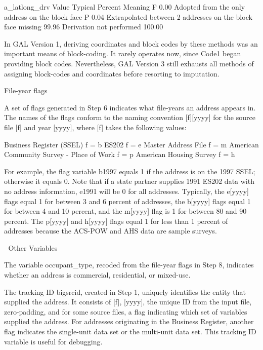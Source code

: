a_latlong_drv
Value  Typical Percent   Meaning
F               0.00          Adopted from the only address on the block face
P               0.04          Extrapolated between 2 addresses on the block face
missing                99.96       Derivation not performed
              100.00

In GAL Version 1, deriving coordinates and block codes by these methods was an important means of
block-coding. It rarely operates now, since Code1 began providing block codes. Nevertheless, GAL
Version 3 still exhausts all methods of assigning block-codes and coordinates before resorting to
imputation. 

File-year flags

A set of flags generated in Step 6 indicates what file-years an address appears in. The names of the flags
conform to the naming convention [f][yyyy] for the source file [f] and year [yyyy], where [f] takes the
following values:

Business Register (SSEL)                f = b
ES202                              f = e
Master Address File                     f = m
American Community Survey - Place of Work    f = p
American Housing Survey            f = h

For example, the flag variable b1997 equals 1 if the address is on the 1997 SSEL; otherwise it equals 0.
Note that if a state partner supplies 1991 ES202 data with no address information, e1991 will be 0 for all
addresses. Typically, the e[yyyy] flags equal 1 for between 3 and 6 percent of addresses, the b[yyyy]
flags equal 1 for between 4 and 10 percent, and the m[yyyy] flag is 1 for between 80 and 90 percent. The
p[yyyy] and h[yyyy] flags equal 1 for less than 1 percent of addresses because the ACS-POW and AHS
data are sample surveys. 


                                                        Other Variables

The variable occupant_type, recoded from the file-year flags in Step 8, indicates whether an address is
commercial, residential, or mixed-use. 

The tracking ID bigsrcid, created in Step 1, uniquely identifies the entity that supplied the address. It
consists of [f], [yyyy], the unique ID from the input file, zero-padding, and for some source files, a flag
indicating which set of variables supplied the address. For addresses originating in the Business Register,
another flag indicates the single-unit data set or the multi-unit data set. This tracking ID variable is useful
for debugging. 

